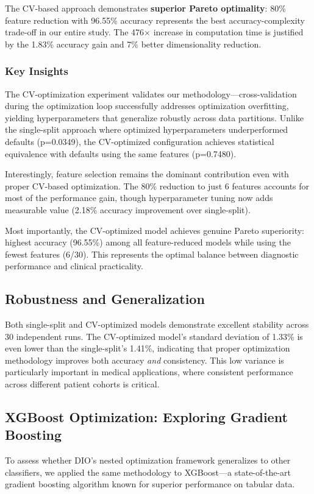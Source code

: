 \documentclass[12pt, a4paper]{article}
\begin{document}
The CV-based approach demonstrates \textbf{superior Pareto optimality}: 80\% feature reduction with 96.55\% accuracy represents the best accuracy-complexity trade-off in our entire study. The 476$\times$ increase in computation time is justified by the 1.83\% accuracy gain and 7\% better dimensionality reduction.

\subsubsection{Key Insights}
The CV-optimization experiment validates our methodology—cross-validation during the optimization loop successfully addresses optimization overfitting, yielding hyperparameters that generalize robustly across data partitions. Unlike the single-split approach where optimized hyperparameters underperformed defaults (p=0.0349), the CV-optimized configuration achieves statistical equivalence with defaults using the same features (p=0.7480).

Interestingly, feature selection remains the dominant contribution even with proper CV-based optimization. The 80\% reduction to just 6 features accounts for most of the performance gain, though hyperparameter tuning now adds measurable value (2.18\% accuracy improvement over single-split).

Most importantly, the CV-optimized model achieves genuine Pareto superiority: highest accuracy (96.55\%) among all feature-reduced models while using the fewest features (6/30). This represents the optimal balance between diagnostic performance and clinical practicality.

\subsection{Robustness and Generalization}
Both single-split and CV-optimized models demonstrate excellent stability across 30 independent runs. The CV-optimized model's standard deviation of 1.33\% is even lower than the single-split's 1.41\%, indicating that proper optimization methodology improves both accuracy \textit{and} consistency. This low variance is particularly important in medical applications, where consistent performance across different patient cohorts is critical.

\subsection{XGBoost Optimization: Exploring Gradient Boosting}
To assess whether DIO's nested optimization framework generalizes to other classifiers, we applied the same methodology to XGBoost—a state-of-the-art gradient boosting algorithm known for superior performance on tabular data.
\end{document}
